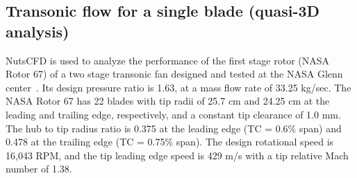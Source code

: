 \documentclass[journal,final]{new-aiaa}
\begin{document}
%
%
%
%

\subsection{Transonic flow for a single blade (quasi-3D analysis)}
NutsCFD is used to analyze the performance of the first
stage rotor (NASA Rotor 67) of a two stage transonic fan
designed and tested at the NASA Glenn center~\cite{strazisar1989laser}.
Its design pressure ratio is
1.63, at a mass flow rate of 33.25 kg/sec. 
The NASA Rotor 67 has 22 blades with tip radii of 25.7 cm
and 24.25 cm at the leading and trailing edge, respectively,
and a constant tip clearance of 1.0 mm. The hub to tip radius
ratio is 0.375 at the leading edge (TC = 0.6\% span) and 0.478
at the trailing edge (TC = 0.75\% span). The design rotational
speed is 16,043 RPM, and the tip leading edge speed is 429 m/s
with a tip relative Mach number of 1.38.
\end{document}
